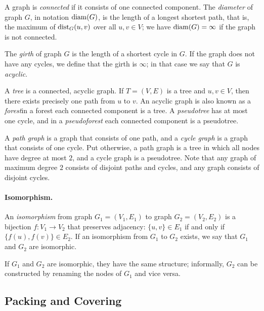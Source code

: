 A graph is \emph{connected} if it consists of one connected component. The \emph{diameter} of graph $G$, in notation $\operatorname{diam}(G)$, is the length of a longest shortest path, that is, the maximum of $\operatorname{dist}_G(u,v)$ over all $u, v \in V$; we have $\operatorname{diam}(G) = \infty$ if the graph is not connected.

The \emph{girth} of graph $G$ is the length of a shortest cycle in $G$. If the graph does not have any cycles, we define that the girth is $\infty$; in that case we say that $G$ is \emph{acyclic}.

A \emph{tree} is a connected, acyclic graph. If $T = (V,E)$ is a tree and $u,v \in V$, then there exists precisely one path from $u$ to $v$. An acyclic graph is also known as a \emph{forest}\mydash in a forest each connected component is a tree. A \emph{pseudotree} has at most one cycle, and in a \emph{pseudoforest} each connected component is a pseudotree.

A \emph{path graph} is a graph that consists of one path, and a \emph{cycle graph} is a graph that consists of one cycle. Put otherwise, a path graph is a tree in which all nodes have degree at most $2$, and a cycle graph is a  pseudotree. Note that any graph of maximum degree $2$ consists of disjoint paths and cycles, and any  graph consists of disjoint cycles.

\paragraph{Isomorphism.}

An \emph{isomorphism} from graph $G_1 = (V_1,E_1)$ to graph $G_2 = (V_2,E_2)$ is a bijection $f\colon V_1 \to V_2$ that preserves adjacency: $\{u,v\} \in E_1$ if and only if $\{f(u),f(v)\} \in E_2$. If an isomorphism from $G_1$ to $G_2$ exists, we say that $G_1$ and $G_2$ are isomorphic.

If $G_1$ and $G_2$ are isomorphic, they have the same structure; informally, $G_2$ can be constructed by renaming the nodes of $G_1$ and vice versa.


\subsection{Packing and Covering}\label{ssec:packingcovering}

